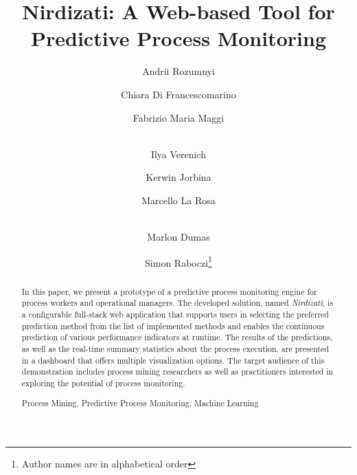 \documentclass[runningheads,a4paper]{llncs}
\newcommand{\keywords}[1]{\par\addvspace\baselineskip
\noindent\keywordname\enspace\ignorespaces#1}
\begin{document}
\mainmatter  %

\title{Nirdizati: A Web-based Tool for Predictive Process Monitoring}


%
%
\author{Andrii Rozumnyi \and Chiara Di Francescomarino \and Fabrizio Maria Maggi \and \\Ilya Verenich \and Kerwin Jorbina \and Marcello La Rosa \and \\ Marlon Dumas \and Simon Raboczi\thanks{Author names are in alphabetical order}}


%
%

\maketitle


\begin{abstract}
In this paper, we present a prototype of a predictive process monitoring engine for process workers and operational managers.
The developed solution, named \emph{Nirdizati}, is a configurable full-stack web application that supports users in selecting the preferred prediction method from the list of implemented methods and enables the continuous prediction of various performance indicators at runtime.
The results of the predictions, as well as the real-time summary statistics about the process execution, are presented in a dashboard that offers multiple visualization options.
The target audience of this demonstration includes process mining researchers as well as practitioners interested in exploring the potential of process monitoring.
\keywords{Process Mining, Predictive Process Monitoring, Machine Learning}
\end{abstract}
\end{document}
